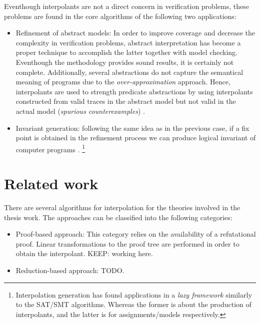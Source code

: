 Eventhough interpolants are not a direct concern in verification
problems, these problems are found in the core algorithms of the 
following two applications:

\begin{itemize}
  \item Refinement of abstract models: In order to improve 
    coverage and decrease the complexity in verification problems,
    abstract interpretation has become a proper technique to 
    accomplish the latter together with model checking. Eventhough the
    methodology provides sound results, it is certainly not complete.
    Additionally, several abstractions do not capture the semantical
    meaning of programs due to the \emph{over-approximation} approach.
    Hence, interpolants are used to strength predicate
    abstractions by using interpolants constructed from valid 
    traces in the abstract model but not valid in the actual model
    (\emph{spurious counterexamples}) \cite{10.1145/876638.876643,
    10.1007/978-3-540-45069-6_1, 10.1145/982962.964021}.
  \item Invariant generation: following the same idea as in the previous
    case, if a fix point is obtained in the refinement process 
    we can produce logical invariant of computer programs \cite
    {10.1007/978-3-540-45069-6_1, 4401986}. \footnote{Interpolation
      generation has found applications in a \emph{lazy framework}
      similarly to the SAT/SMT algorithms. Whereas the former is
    about the production of interpolants, and the latter is for 
  assignments/models respectively.}
\end{itemize}

\section{Related work}

There are several algorithms for interpolation for the theories
involved in the thesis work. The approaches can be classified
into the following categories:

\begin{itemize}
  \item Proof-based approach: This category relies on the availability
    of a refutational proof. Linear transformations to the proof
    tree are performed in order to obtain the interpolant.
    KEEP: working here.

  \item Reduction-based approach: TODO.

\end{itemize}

